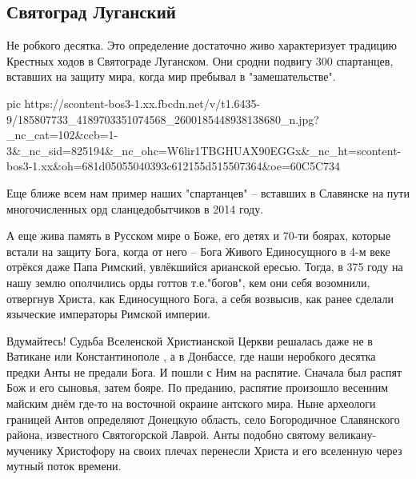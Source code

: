  
 
 
 
 
\subsection{Святоград Луганский}

Не робкого десятка. Это определение достаточно живо характеризует традицию
Крестных ходов в Святограде Луганском.  Они сродни подвигу 300 спартанцев,
вставших на защиту мира, когда мир пребывал в "замешательстве". 

\ifcmt
  pic https://scontent-bos3-1.xx.fbcdn.net/v/t1.6435-9/185807733_4189703351074568_2600185448938138680_n.jpg?_nc_cat=102&ccb=1-3&_nc_sid=825194&_nc_ohc=W6lir1TBGHUAX90EGGx&_nc_ht=scontent-bos3-1.xx&oh=681d05055040393c612155d515507364&oe=60C5C734
\fi


Еще ближе всем нам пример наших "спартанцев" –  вставших в Славянске на пути многочисленных орд сланцедобытчиков в 2014 году. 

А еще  жива память в Русском мире  о  Боже, его детях и 70-ти боярах, которые
встали на защиту Бога, когда от него – Бога Живого Единосущного в 4-м веке
отрёкся даже Папа Римский, увлёкшийся арианской ересью. Тогда, в 375 году на
нашу землю ополчились орды готтов т.е."богов", кем они себя возомнили,
отвергнув Христа, как Единосущного Бога, а себя возвысив, как ранее сделали
языческие императоры Римской империи. 

Вдумайтесь! Судьба Вселенской Христианской Церкви решалась даже не в Ватикане
или Константинополе , а в Донбассе, где наши неробкого десятка предки Анты не
предали Бога.  И пошли с Ним на распятие. Сначала был распят Бож и его сыновья,
затем бояре. По преданию, распятие произошло весенним майским днём где-то на
восточной окраине антского мира. Ныне археологи границей Антов определяют
Донецкую область, село Богородичное Славянского района, известного
Святогорской Лаврой. Анты подобно святому великану-мученику Христофору на своих
плечах перенесли Христа и его вселенную через мутный поток  времени.


